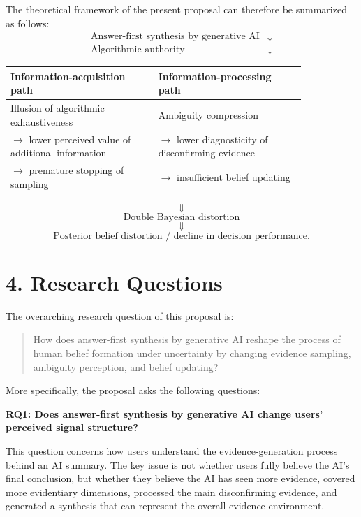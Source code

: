 The theoretical framework of the present proposal can therefore be summarized as follows:
\begin{align*}
\text{Answer-first synthesis by generative AI}
&\downarrow \\
\text{Algorithmic authority}
&\downarrow
\end{align*}

\begin{center}
\begin{tabular}{p{0.42\linewidth} p{0.42\linewidth}}
\toprule
\textbf{Information-acquisition path} & \textbf{Information-processing path} \\
\midrule
Illusion of algorithmic exhaustiveness & Ambiguity compression \\
$\rightarrow$ lower perceived value of additional information & $\rightarrow$ lower diagnosticity of disconfirming evidence \\
$\rightarrow$ premature stopping of sampling & $\rightarrow$ insufficient belief updating \\
\bottomrule
\end{tabular}
\end{center}

\[
\Downarrow
\]
\[
\text{Double Bayesian distortion}
\]
\[
\Downarrow
\]
\[
\text{Posterior belief distortion / decline in decision performance}.
\]

\section*{4. Research Questions}

The overarching research question of this proposal is:

\begin{quote}
How does answer-first synthesis by generative AI reshape the process of human belief formation under uncertainty by changing evidence sampling, ambiguity perception, and belief updating?
\end{quote}

More specifically, the proposal asks the following questions:

\textbf{RQ1: Does answer-first synthesis by generative AI change users' perceived signal structure?}

This question concerns how users understand the evidence-generation process behind an AI summary. The key issue is not whether users fully believe the AI's final conclusion, but whether they believe the AI has seen more evidence, covered more evidentiary dimensions, processed the main disconfirming evidence, and generated a synthesis that can represent the overall evidence environment.

